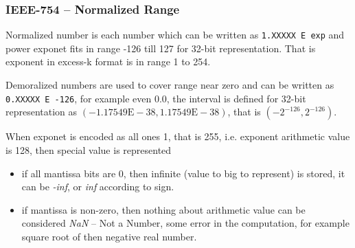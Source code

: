 \documentclass{beamer}
\begin{document}
\begin{frame}
\frametitle{IEEE-754 -- Normalized Range}

Normalized number is each number which can be written as \texttt{1.XXXXX E exp} and power exponet fits in range -126 till 127 for 32-bit representation. That is exponent in excess-k format is in range 1 to 254.

\bigskip
Demoralized numbers are used to cover range near zero and can be written as \texttt{0.XXXXX E -126}, for example even 0.0, the interval is defined for 32-bit representation as $(-1.17549\text{E}-38,1.17549\text{E}-38)$, that is $(-2^{-126},2^{-126})$.

\bigskip
When exponet is encoded as all ones 1, that is 255, i.e. exponent arithmetic value is 128, then special value is represented 
\begin{itemize}
\item if all mantissa bits are 0, then infinite (value to big to represent) is stored, it can be \textit{-inf}, or \textit{inf} according to sign.
\item if mantissa is non-zero, then nothing about arithmetic value can be considered \textit{NaN} -- Not a Number, some error in the computation, for example square root of then negative real number.
\end{itemize}
\end{frame}
\end{document}
